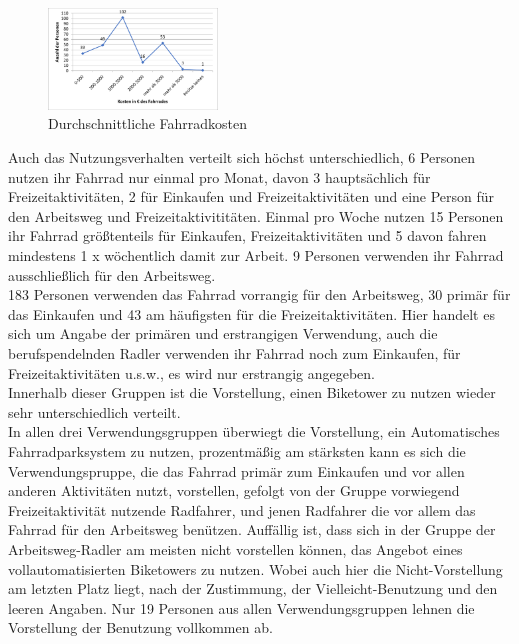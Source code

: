 \begin{figure}[H]
    \centering
    \includegraphics[width=0.4\textwidth]{images/fahrradkosten.png}
    \caption{Durchschnittliche Fahrradkosten}
    \label{fig:fahrradkosten}
\end{figure}
Auch das Nutzungsverhalten verteilt sich höchst unterschiedlich, 6 Personen nutzen ihr Fahrrad nur einmal pro Monat, davon 3 hauptsächlich für Freizeitaktivitäten, 2 für Einkaufen und Freizeitaktivitäten und eine Person für den Arbeitsweg und Freizeitaktivititäten. Einmal pro Woche nutzen 15 Personen ihr Fahrrad größtenteils für Einkaufen, Freizeitaktivitäten und 5 davon fahren mindestens 1 x wöchentlich damit zur Arbeit. 9 Personen verwenden ihr Fahrrad ausschließlich für den Arbeitsweg.\\
183 Personen verwenden das Fahrrad vorrangig für den Arbeitsweg, 30 primär für das Einkaufen und 43 am häufigsten für die Freizeitaktivitäten. Hier handelt es sich um Angabe der primären und erstrangigen Verwendung, auch die berufspendelnden Radler verwenden ihr Fahrrad noch zum Einkaufen, für Freizeitaktivitäten u.s.w., es wird nur erstrangig angegeben.\\
Innerhalb dieser Gruppen ist die Vorstellung, einen Biketower zu nutzen wieder sehr unterschiedlich verteilt.\\
In allen drei Verwendungsgruppen überwiegt die Vorstellung, ein Automatisches Fahrradparksystem zu nutzen, prozentmäßig am stärksten kann es sich die Verwendungspruppe, die das Fahrrad primär zum Einkaufen und vor allen anderen Aktivitäten nutzt, vorstellen, gefolgt von der Gruppe vorwiegend Freizeitaktivität nutzende Radfahrer, und jenen Radfahrer die vor allem das Fahrrad für den Arbeitsweg benützen. Auffällig ist, dass sich in der Gruppe der Arbeitsweg-Radler am meisten nicht vorstellen können, das Angebot eines vollautomatisierten Biketowers zu nutzen. Wobei auch hier die Nicht-Vorstellung am letzten Platz liegt, nach der Zustimmung, der Vielleicht-Benutzung und den leeren Angaben. Nur 19 Personen aus allen Verwendungsgruppen lehnen die Vorstellung der Benutzung vollkommen ab.\\





